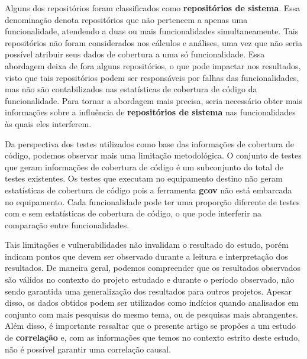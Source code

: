 \documentclass[11.5pt]{article}
\begin{document}
Alguns dos repositórios foram classificados como \textbf{repositórios de sistema}.
Essa denominação denota repositórios que não pertencem a apenas uma funcionalidade, atendendo a duas
ou mais funcionalidades simultaneamente.
Tais repositórios não foram considerados nos cálculos e análises, uma vez que não seria possível
atribuir seus dados de cobertura a uma só funcionalidade.
Essa abordagem deixa de fora alguns repositórios, o que pode impactar nos resultados, visto que tais
repositórios podem ser responsáveis por falhas das funcionalidades, mas não são contabilizados nas
estatísticas de cobertura de código da funcionalidade.
Para tornar a abordagem mais precisa, seria necessário obter mais informações sobre a influência
de \textbf{repositórios de sistema} nas funcionalidades às quais eles interferem.

Da perspectiva dos testes utilizados como base das informações de cobertura de código, podemos
observar mais uma limitação metodológica.
O conjunto de testes que geram informações de cobertura de código é um subconjunto do total de
testes existentes.
Os testes que executam no equipamento destino não geram estatísticas de cobertura de código pois
a ferramenta \textbf{gcov} não está embarcada no equipamento.
Cada funcionalidade pode ter uma proporção diferente de testes com e sem estatísticas de cobertura
de código, o que pode interferir na comparação entre funcionalidades.

Tais limitações e vulnerabilidades não invalidam o resultado do estudo, porém indicam pontos que
devem ser observado durante a leitura e interpretação dos resultados.
De maneira geral, podemos compreender que os resultados observados são válidos no contexto do
projeto estudado e durante o período observado, não sendo garantida uma generalização dos resultados
para outros projetos.
Apesar disso, os dados obtidos podem ser utilizados como indícios quando analisados em conjunto com
mais pesquisas do mesmo tema, ou de pesquisas mais abrangentes.
Além disso, é importante ressaltar que o presente artigo se propões a um estudo de
\textbf{correlação} e, com as informações que temos no contexto estrito deste estudo, não é possível
garantir uma correlação causal.

\end{document}
